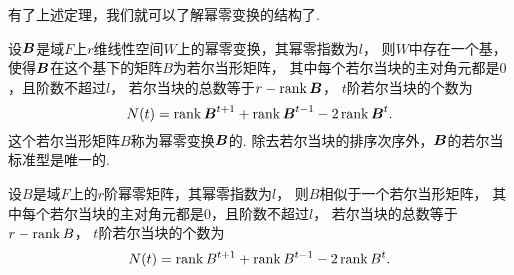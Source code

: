 有了上述定理，我们就可以了解幂零变换的结构了.
\begin{theorem}\label{theorem:幂零变换的结构.幂零变换的若尔当标准型}
设\(\boldsymbol{B}\)是域\(F\)上\(r\)维线性空间\(W\)上的幂零变换，其幂零指数为\(l\)，
则\(W\)中存在一个基，使得\(\boldsymbol{B}\)在这个基下的矩阵\(B\)为若尔当形矩阵，
其中每个若尔当块的主对角元都是\(0\)，且阶数不超过\(l\)，
若尔当块的总数等于\(r - \rank\boldsymbol{B}\)，
\(t\)阶若尔当块的个数为\begin{equation}
	N(t) = \rank\boldsymbol{B}^{t+1} + \rank\boldsymbol{B}^{t-1} - 2 \rank\boldsymbol{B}^t.
\end{equation}
\rm
这个若尔当形矩阵\(B\)称为幂零变换\(\boldsymbol{B}\)的.
除去若尔当块的排序次序外，\(\boldsymbol{B}\)的若尔当标准型是唯一的.
\end{theorem}

\begin{corollary}
设\(B\)是域\(F\)上的\(r\)阶幂零矩阵，其幂零指数为\(l\)，
则\(B\)相似于一个若尔当形矩阵，
其中每个若尔当块的主对角元都是\(0\)，且阶数不超过\(l\)，
若尔当块的总数等于\(r - \rank B\)，
\(t\)阶若尔当块的个数为\begin{equation}
	N(t) = \rank B^{t+1} + \rank B^{t-1} - 2 \rank B^t.
\end{equation}
\end{corollary}
